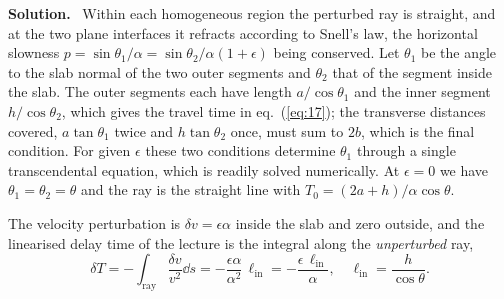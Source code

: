 \documentclass[a4paper,12pt]{paper}
\newenvironment{solution}{\par\noindent\textbf{Solution.}\ }{\par\medskip}
\begin{document}
\begin{solution}
Within each homogeneous region the perturbed ray is straight, and at the two plane interfaces it
refracts according to Snell's law, the horizontal slowness $p=\sin\theta_{1}/\alpha
= \sin\theta_{2}/\alpha(1+\epsilon)$ being conserved. Let $\theta_{1}$ be the angle to the slab normal
of the two outer segments and $\theta_{2}$ that of the segment inside the slab. The outer segments
each have length $a/\cos\theta_{1}$ and the inner segment $h/\cos\theta_{2}$, which gives the travel
time in eq.~(\ref{eq:17}); the transverse distances covered, $a\tan\theta_{1}$ twice and
$h\tan\theta_{2}$ once, must sum to $2b$, which is the final condition. For given $\epsilon$ these two
conditions determine $\theta_{1}$ through a single transcendental equation, which is readily solved
numerically. At $\epsilon=0$ we have $\theta_{1}=\theta_{2}=\theta$ and the ray is the straight line
with $T_{0} = (2a+h)/\alpha\cos\theta$.

The velocity perturbation is $\delta v = \epsilon\alpha$ inside the slab and zero outside, and the
linearised delay time of the lecture is the integral along the \emph{unperturbed} ray,
\begin{equation}
    \delta T = -\int_{\mathrm{ray}}\frac{\delta v}{v^{2}}\dd s = -\frac{\epsilon\alpha}{\alpha^{2}}\,\ell_{\mathrm{in}}
    = -\frac{\epsilon\,\ell_{\mathrm{in}}}{\alpha},\quad \ell_{\mathrm{in}} = \frac{h}{\cos\theta}.
    \label{eq:18}
\end{equation}


\end{solution}
\end{document}
